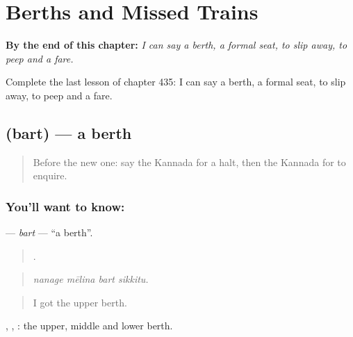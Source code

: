 
\chapter{Berths and Missed Trains}
\label{ch:ka-berths-and-missed-trains}

\begin{chapteropening}
\textbf{By the end of this chapter:} \emph{I can say a berth, a formal seat, to slip away, to peep and a fare.}

Complete the last lesson of chapter 435: I can say a berth, a formal seat, to slip away, to peep and a fare.
\end{chapteropening}

\section[\texorpdfstring{\kn{ಬರ್ತ್} (bart)}{ಬರ್ತ್ (bart)}]{ (bart) — a berth}

\label{lesson:KA-C435-bart}



\begin{quote}
Before the new one: say the Kannada for a halt, then the Kannada for to enquire.
\end{quote}

\subsection*{You'll want to know: }
\textbf{} — \emph{bart} — \textquotedblleft{}a berth\textquotedblright{}.

\begin{quote}
   .
\end{quote}

\begin{quote}
\emph{nanage mēlina bart sikkitu.}
\end{quote}

\begin{quote}
I got the upper berth.
\end{quote}

, ,  : the upper, middle and lower berth.

